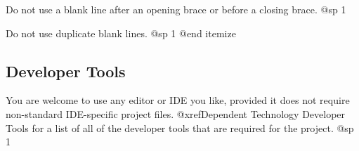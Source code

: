 \item
Do not use a blank line after an opening brace or before a closing brace.
@sp 1

\item
Do not use duplicate blank lines.
@sp 1
@end itemize

\subsection{Developer Tools}
You are welcome to use any editor or IDE you like, provided it does not require non-standard IDE-specific project files. @xref{Dependent Technology Developer Tools} for a list of all of the developer tools that are required for the project.
@sp 1

